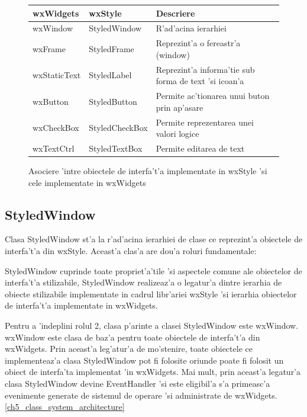 \begin{center}
\begin{figure}[H]
    \centering
    \begin{tabular}{ |p{2.5cm}|p{3cm}|p{9.1cm}| }
        \hline
        \textbf{wxWidgets} & \textbf{wxStyle} & \textbf{Descriere} \\
        \hline
        wxWindow            & StyledWindow      & R'ad'acina ierarhiei  \\
        wxFrame             & StyledFrame       & Reprezint'a o fereastr'a (window)\\
        wxStaticText        & StyledLabel       & Reprezint'a informa'tie sub forma de text 'si icoan'a \\
        wxButton            & StyledButton      & Permite ac'tionarea unui buton prin ap'asare \\
        wxCheckBox          & StyledCheckBox    & Permite reprezentarea unei valori logice \\
        wxTextCtrl          & StyledTextBox     & Permite editarea de text \\
        \hline
    \end{tabular}
    \caption{Asociere 'intre obiectele de interfa't'a implementate in wxStyle 'si cele implementate in wxWidgets}
    \label{comp_tech_int}
\end{figure}
\end{center}




\subsection{StyledWindow}

Clasa StyledWindow st'a la r'ad'acina ierarhiei de clase ce reprezint'a obiectele de interfa't'a din wxStyle. Aceast'a clas'a are dou'a roluri fundamentale:

StyledWindow cuprinde toate propriet'a'tile 'si aspectele comune ale obiectelor de interfa't'a stilizabile, 
StyledWindow realizeaz'a o legatur'a dintre ierarhia de obiecte stilizabile implementate in cadrul libr'ariei wxStyle 'si ierarhia obiectelor de interfa't'a implementate in wxWidgets. 

\medskip

Pentru a 'indeplini rolul 2, clasa p'arinte a clasei StyledWindow este wxWindow. wxWindow este clasa de baz'a pentru toate obiectele de interfa't'a din wxWidgets. Prin aceast'a leg'atur'a de mo'stenire, toate obiectele ce implementeaz'a clasa StyledWindow pot fi folosite oriunde poate fi folosit un obiect de interfa'ta implementat 'in wxWidgets. Mai mult, prin aceast'a legatur'a clasa StyledWindow devine EventHandler 'si este eligibil'a s'a primeasc'a evenimente generate de sistemul de operare 'si administrate de wxWidgets.\ref{ch5_class_system_architecture} 


